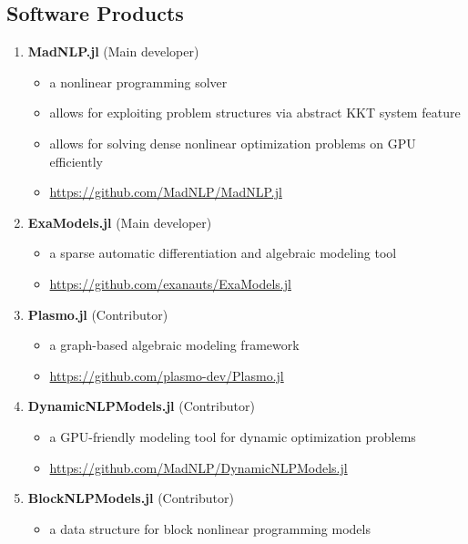 \message{ !name(shin-abet.tex)}\documentclass[letterpaper, 11pt]{article}
\begin{document}
\subsection*{Software Products}
\begin{enumerate}[itemsep=0pt]
\renewcommand*{\labelenumi}{[S\theenumi]}
\item \textbf{MadNLP.jl} (Main developer)
  \begin{itemize}[leftmargin=*,topsep=0pt,label=$\bullet$,topsep=-5pt,itemsep=-1pt]
  \item a nonlinear programming solver
  \item allows for exploiting problem structures via abstract KKT system feature
  \item allows for solving dense nonlinear optimization problems on GPU efficiently
  \item \url{https://github.com/MadNLP/MadNLP.jl}
\end{itemize}
\item \textbf{ExaModels.jl} (Main developer)
  \begin{itemize}[leftmargin=*,topsep=0pt,label=$\bullet$,topsep=-5pt,itemsep=-1pt]
  \item a sparse automatic differentiation and algebraic modeling tool
  \item \url{https://github.com/exanauts/ExaModels.jl}
  \end{itemize}
\item \textbf{Plasmo.jl} (Contributor)
  \begin{itemize}[leftmargin=*,topsep=0pt,label=$\bullet$,topsep=-5pt,itemsep=-1pt]
  \item a graph-based algebraic modeling framework
  \item \url{https://github.com/plasmo-dev/Plasmo.jl}
  \end{itemize}
\item \textbf{DynamicNLPModels.jl} (Contributor)
  \begin{itemize}[leftmargin=*,topsep=0pt,label=$\bullet$,topsep=-5pt,itemsep=-1pt]
  \item a GPU-friendly modeling tool for dynamic optimization problems
  \item \url{https://github.com/MadNLP/DynamicNLPModels.jl}
  \end{itemize}
\item \textbf{BlockNLPModels.jl} (Contributor)
  \begin{itemize}[leftmargin=*,topsep=0pt,label=$\bullet$,topsep=-5pt,itemsep=-1pt]
  \item a data structure for block nonlinear programming models

\end{itemize}
\end{enumerate}
\end{document}
